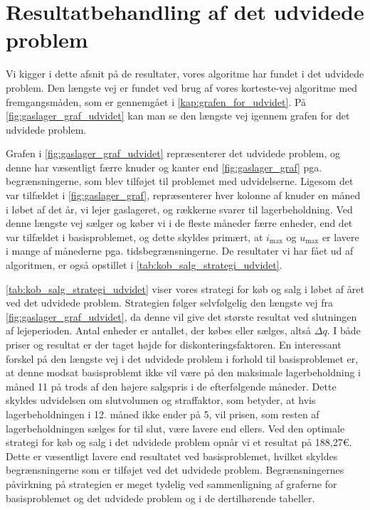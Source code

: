 \section{Resultatbehandling af det udvidede problem} \label{kap:resultat_udvidet}

Vi kigger i dette afsnit på de resultater, vores algoritme har fundet i det udvidede problem. Den længste vej er fundet ved brug af vores korteste-vej algoritme med fremgangsmåden, som er gennemgået i \autoref{kap:grafen_for_udvidet}. På \ref{fig:gaslager_graf_udvidet} kan man se den længste vej igennem grafen for det udvidede problem.

Grafen i \autoref{fig:gaslager_graf_udvidet} repræsenterer det udvidede problem, og denne har væsentligt færre knuder og kanter end \autoref{fig:gaslager_graf} pga. begrænsningerne, som blev tilføjet til problemet med udvidelserne. Ligesom det var tilfældet i \autoref{fig:gaslager_graf}, repræsenterer hver kolonne af knuder en måned i løbet af det år, vi lejer gaslageret, og rækkerne svarer til lagerbeholdning. Ved denne længste vej sælger og køber vi i de fleste måneder færre enheder, end det var tilfældet i basisproblemet, og dette skyldes primært, at $i_{\max}$ og $u_{\max}$ er lavere i mange af månederne pga. tidsbegrænsningerne. De resultater vi har fået ud af algoritmen, er også opstillet i \autoref{tab:kob_salg_strategi_udvidet}. 

\autoref{tab:kob_salg_strategi_udvidet} viser vores strategi for køb og salg i løbet af året ved det udvidede problem. Strategien følger selvfølgelig den længste vej fra \autoref{fig:gaslager_graf_udvidet}, da denne vil give det største resultat ved slutningen af lejeperioden. Antal enheder er antallet, der købes eller sælges, altså $\Delta q$. I både priser og resultat er der taget højde for diskonteringsfaktoren. En interessant forskel på den længste vej i det udvidede problem i forhold til basisproblemet er, at denne modsat basisproblemt ikke vil være på den maksimale lagerbeholdning i måned 11 på trods af den højere salgspris i de efterfølgende måneder. Dette skyldes udvidelsen om slutvolumen og straffaktor, som betyder, at hvis lagerbeholdningen i 12. måned ikke ender på 5, vil prisen, som resten af lagerbeholdningen sælges for til slut, være lavere end ellers. 
Ved den optimale strategi for køb og salg i det udvidede problem opnår vi et resultat på 188,27€. Dette er væsentligt lavere end resultatet ved basisproblemet, hvilket skyldes begrænsningerne som er tilføjet ved det udvidede problem. Begrænsningernes påvirkning på strategien er meget tydelig ved sammenligning af graferne for basisproblemet og det udvidede problem og i de dertilhørende tabeller. 